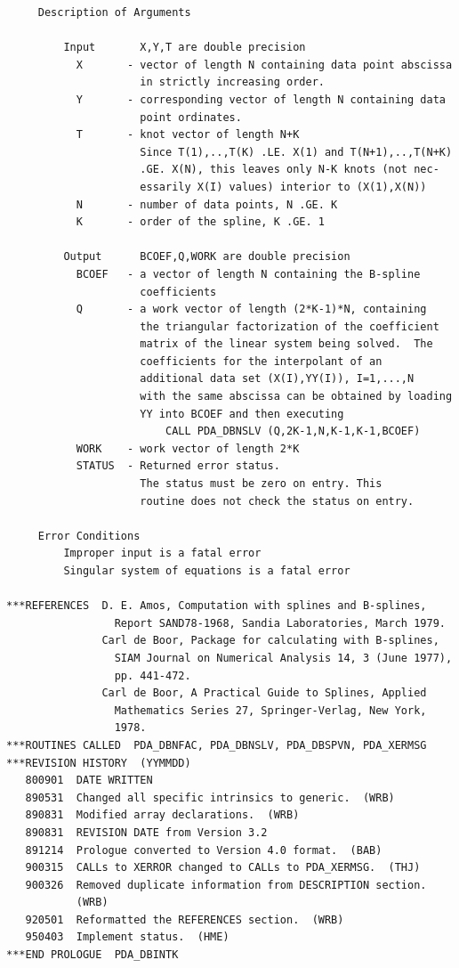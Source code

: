 \documentclass[11pt,twoside]{article}
\begin{document}
\begin{verbatim}
     Description of Arguments

         Input       X,Y,T are double precision
           X       - vector of length N containing data point abscissa
                     in strictly increasing order.
           Y       - corresponding vector of length N containing data
                     point ordinates.
           T       - knot vector of length N+K
                     Since T(1),..,T(K) .LE. X(1) and T(N+1),..,T(N+K)
                     .GE. X(N), this leaves only N-K knots (not nec-
                     essarily X(I) values) interior to (X(1),X(N))
           N       - number of data points, N .GE. K
           K       - order of the spline, K .GE. 1

         Output      BCOEF,Q,WORK are double precision
           BCOEF   - a vector of length N containing the B-spline
                     coefficients
           Q       - a work vector of length (2*K-1)*N, containing
                     the triangular factorization of the coefficient
                     matrix of the linear system being solved.  The
                     coefficients for the interpolant of an
                     additional data set (X(I),YY(I)), I=1,...,N
                     with the same abscissa can be obtained by loading
                     YY into BCOEF and then executing
                         CALL PDA_DBNSLV (Q,2K-1,N,K-1,K-1,BCOEF)
           WORK    - work vector of length 2*K
           STATUS  - Returned error status.
                     The status must be zero on entry. This
                     routine does not check the status on entry.

     Error Conditions
         Improper input is a fatal error
         Singular system of equations is a fatal error

***REFERENCES  D. E. Amos, Computation with splines and B-splines,
                 Report SAND78-1968, Sandia Laboratories, March 1979.
               Carl de Boor, Package for calculating with B-splines,
                 SIAM Journal on Numerical Analysis 14, 3 (June 1977),
                 pp. 441-472.
               Carl de Boor, A Practical Guide to Splines, Applied
                 Mathematics Series 27, Springer-Verlag, New York,
                 1978.
***ROUTINES CALLED  PDA_DBNFAC, PDA_DBNSLV, PDA_DBSPVN, PDA_XERMSG
***REVISION HISTORY  (YYMMDD)
   800901  DATE WRITTEN
   890531  Changed all specific intrinsics to generic.  (WRB)
   890831  Modified array declarations.  (WRB)
   890831  REVISION DATE from Version 3.2
   891214  Prologue converted to Version 4.0 format.  (BAB)
   900315  CALLs to XERROR changed to CALLs to PDA_XERMSG.  (THJ)
   900326  Removed duplicate information from DESCRIPTION section.
           (WRB)
   920501  Reformatted the REFERENCES section.  (WRB)
   950403  Implement status.  (HME)
***END PROLOGUE  PDA_DBINTK
\end{verbatim}
\end{document}
